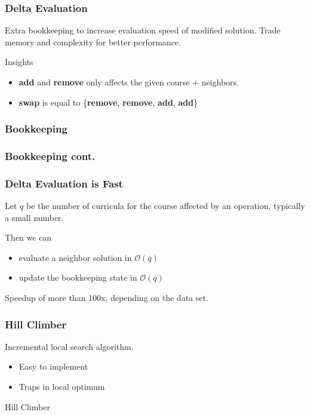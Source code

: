 \documentclass{beamer}
\makeatletter
\newenvironment{algorithm}[1][]{%
  \def\@captype{algorithm}%
  \par\nobreak\begin{center}\nobreak}
  {\par\nobreak\end{center}\nobreak}
\newcounter{algorithm}
\makeatother
\begin{document}
\begin{frame}
	\frametitle{Delta Evaluation}
	Extra bookkeeping to increase evaluation speed of modified solution.
	Trade memory and complexity for better performance.
	
	\begin{block}{Insights}
		\begin{itemize}
			\item \textbf{add} and \textbf{remove} only affects the given course $+$ neighbors.
			\item \textbf{swap} is equal to \{\textbf{remove}, \textbf{remove}, \textbf{add}, \textbf{add}\}
		\end{itemize}	
	\end{block}
	
\end{frame}

\begin{frame}
	\frametitle{Bookkeeping}
	\lstI
\end{frame}

\begin{frame}
	\frametitle{Bookkeeping cont.}
	\lstII
\end{frame}

\begin{frame}
	\frametitle{Delta Evaluation is Fast}
	Let $q$ be the number of curricula for the course affected by an operation, typically a small number.
	
	Then we can
	\begin{itemize}
		\item evaluate a neighbor solution in $\mathcal{O}(q)$
		\item update the bookkeeping state in $\mathcal{O}(q)$
	\end{itemize}
	
	
	Speedup of more than 100x, depending on the data set.
\end{frame}


\begin{frame}
\frametitle{Hill Climber}
Incremental local search algorithm. 
\begin{itemize}
\item Easy to implement
\item Traps in local optimum
\end{itemize}
\begin{algorithm}[H]
\begin{algorithmic}[1]
\REPEAT
{}
\ENDIF
{}
\end{algorithmic}
\caption{Hill Climber }
\label{alg:seq}
\end{algorithm}
\end{frame}
\end{document}
